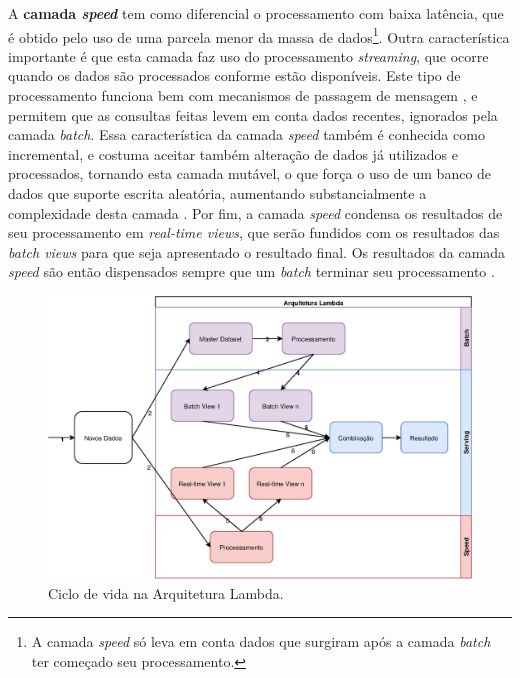 \newpage
A \textbf{camada \textit{speed}} tem como diferencial o processamento com baixa
latência, que é obtido pelo uso de uma parcela menor da massa de dados\footnote{
A camada \textit{speed} só leva em conta dados que surgiram após a camada
\textit{batch} ter começado seu processamento.}. Outra característica importante
é que esta camada faz uso do processamento \textit{streaming}, que ocorre
quando os dados são processados conforme estão disponíveis. Este tipo de
processamento funciona bem com mecanismos de passagem de mensagem
\cite{marz2015}, e permitem que as consultas feitas levem em conta dados
recentes, ignorados pela camada \textit{batch}. Essa característica da
camada \textit{speed} também é conhecida como incremental, e costuma aceitar
também alteração de dados já utilizados e processados, tornando esta camada
mutável, o que força o uso de um banco de dados que suporte escrita aleatória,
aumentando substancialmente a complexidade desta camada \cite{marz2015}. Por
fim, a camada \textit{speed} condensa os resultados de seu processamento em
\textit{real-time views}, que serão fundidos com os resultados das
\textit{batch views} para que seja apresentado o resultado final. Os resultados
da camada \textit{speed} são então dispensados sempre que um \textit{batch}
terminar seu processamento \cite{marz2015}.

\begin{figure}
  \centering
    \includegraphics[width=\textwidth]{figuras/lambda-lifecycle.eps}
  \caption{Ciclo de vida na Arquitetura Lambda.}
  \label{fig:lambda-lifecycle}
\end{figure}

